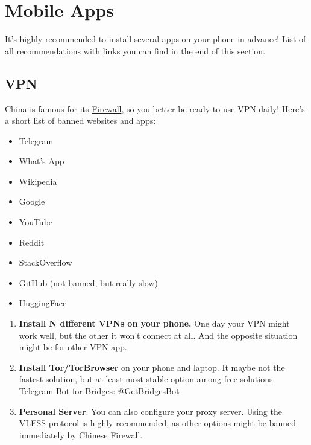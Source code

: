 


\newcommand{\applinks}[2][]{
    \ifthenelse{\equal{#1}{}}
        {\href{#2}{PlatMarket}}
        {\href{#2}{PlatMarket}, \href{#1}{AppStore}}%
}

\chapter{Mobile Apps}\label{ch:ru_apps}

It's highly recommended to install several apps on your phone in advance!
List of all recommendations with links you can find in the end of this section.


\section{VPN}\label{subsec:ru_vpn}
China is famous for its \href{https://en.wikipedia.org/wiki/Great_Firewall}{Firewall},
so you better be ready to use VPN daily!
Here's a short list of banned websites and apps:

\begin{multicols}{2}
\begin{itemize}
    \item Telegram
    \item What's App
    \item Wikipedia
    \item Google
    \item YouTube
    \item Reddit
    \item StackOverflow
    \item GitHub (not banned, but really slow)
    \item HuggingFace
\end{itemize}
\end{multicols}

\begin{enumerate}
    \item \textbf{Install N different VPNs on your phone.}
        One day your VPN might work well, but the other it won't connect at all.
        And the opposite situation might be for other VPN app.

    \item \textbf{Install Tor/TorBrowser} on your phone and laptop.
        It maybe not the fastest solution, but at least most stable option among free solutions.
        Telegram Bot for Bridges: \href{https://t.me/GetBridgesBot}{@GetBridgesBot}

    \item \textbf{Personal Server}.
        You can also configure your proxy server.
        Using the VLESS protocol is highly recommended, as other options might be banned immediately by Chinese Firewall.
\end{enumerate}




